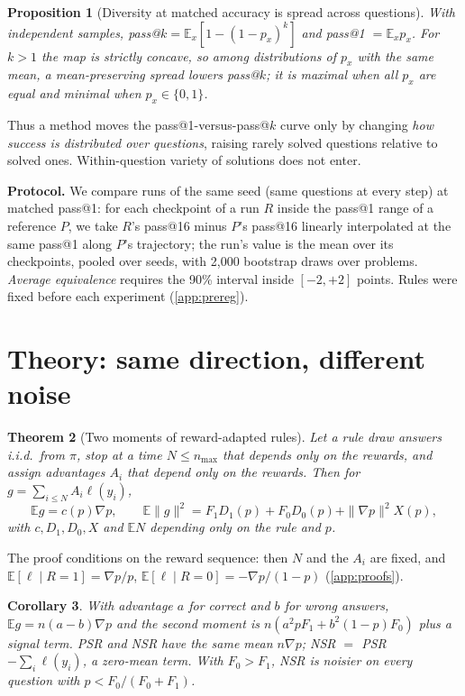 \documentclass{article}
\theoremstyle{plain}
\newtheorem{theorem}{Theorem}[section]
\newtheorem{proposition}[theorem]{Proposition}
\newtheorem{corollary}[theorem]{Corollary}
\theoremstyle{remark}
\newcommand{\E}{\mathbb E}
\begin{document}
\begin{proposition}[Diversity at matched accuracy is spread across questions]\label{prop:spread}
With independent samples, pass@$k=\E_x[1-(1-p_x)^k]$ and pass@1 $=\E_x p_x$. For $k>1$ the map is strictly concave, so among distributions of $p_x$ with the same mean, a mean-preserving spread lowers pass@$k$; it is maximal when all $p_x$ are equal and minimal when $p_x\in\{0,1\}$.
\end{proposition}
Thus a method moves the pass@1-versus-pass@$k$ curve only by changing \emph{how success is distributed over questions}, raising rarely solved questions relative to solved ones. Within-question variety of solutions does not enter.

\textbf{Protocol.} We compare runs of the same seed (same questions at every step) at matched pass@1: for each checkpoint of a run $R$ inside the pass@1 range of a reference $P$, we take $R$'s pass@16 minus $P$'s pass@16 linearly interpolated at the same pass@1 along $P$'s trajectory; the run's value is the mean over its checkpoints, pooled over seeds, with 2,000 bootstrap draws over problems. \emph{Average equivalence} requires the 90\% interval inside $[-2,+2]$ points. Rules were fixed before each experiment (\cref{app:prereg}).

\section{Theory: same direction, different noise}\label{sec:theory}
\begin{theorem}[Two moments of reward-adapted rules]\label{thm:moments}
Let a rule draw answers i.i.d.\ from $\pi$, stop at a time $N\le n_{\max}$ that depends only on the rewards, and assign advantages $A_i$ that depend only on the rewards. Then for $g=\sum_{i\le N}A_i\ell(y_i)$,
\[\E g=c(p)\nabla p,\qquad \E\|g\|^2=F_1D_1(p)+F_0D_0(p)+\|\nabla p\|^2X(p),\]
with $c,D_1,D_0,X$ and $\E N$ depending only on the rule and $p$.
\end{theorem}
The proof conditions on the reward sequence: then $N$ and the $A_i$ are fixed, and $\E[\ell\mid R=1]=\nabla p/p$, $\E[\ell\mid R=0]=-\nabla p/(1-p)$ (\cref{app:proofs}).

\begin{corollary}\label{cor:psrnsr}
With advantage $a$ for correct and $b$ for wrong answers, $\E g=n(a-b)\nabla p$ and the second moment is $n(a^2pF_1+b^2(1-p)F_0)$ plus a signal term. PSR and NSR have the same mean $n\nabla p$; NSR $=$ PSR $-\sum_i\ell(y_i)$, a zero-mean term. With $F_0>F_1$, NSR is noisier on every question with $p<F_0/(F_0+F_1)$.
\end{corollary}
\end{document}
